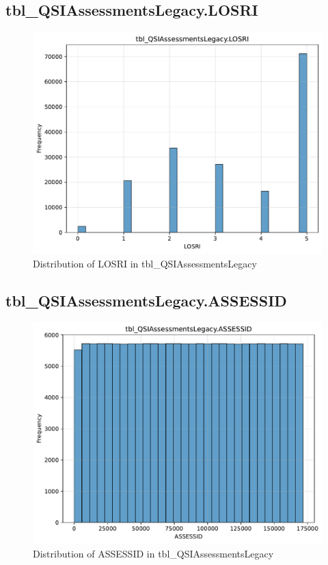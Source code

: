 \subsection{tbl\_QSIAssessmentsLegacy.LOSRI}

\begin{figure}[htbp]
\centering
\includegraphics[width=\textwidth]{figures/dbo_tbl_QSIAssessmentsLegacy_LOSRI.pdf}
\caption{Distribution of LOSRI in tbl\_QSIAssessmentsLegacy}
\end{figure}\newpage

\subsection{tbl\_QSIAssessmentsLegacy.ASSESSID}

\begin{figure}[htbp]
\centering
\includegraphics[width=\textwidth]{figures/dbo_tbl_QSIAssessmentsLegacy_ASSESSID.pdf}
\caption{Distribution of ASSESSID in tbl\_QSIAssessmentsLegacy}
\end{figure}\newpage

